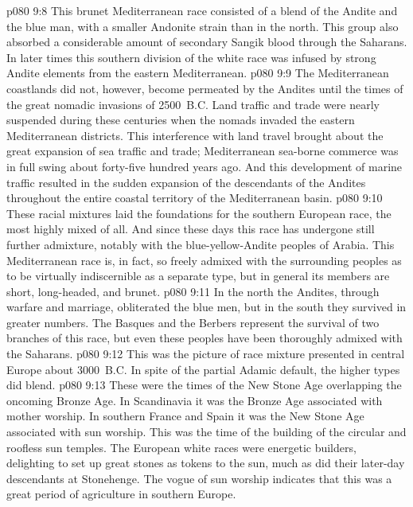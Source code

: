\pc \vs p080 9:8 \bibnobreakspace {} This brunet Mediterranean race consisted of a blend of the Andite and the blue man, with a smaller Andonite strain than in the north. This group also absorbed a considerable amount of secondary Sangik blood through the Saharans. In later times this southern division of the white race was infused by strong Andite elements from the eastern Mediterranean.
\vs p080 9:9 The Mediterranean coastlands did not, however, become permeated by the Andites until the times of the great nomadic invasions of 2500~B.C. Land traffic and trade were nearly suspended during these centuries when the nomads invaded the eastern Mediterranean districts. This interference with land travel brought about the great expansion of sea traffic and trade; Mediterranean sea\hyp{}borne commerce was in full swing about forty\hyp{}five hundred years ago. And this development of marine traffic resulted in the sudden expansion of the descendants of the Andites throughout the entire coastal territory of the Mediterranean basin.
\vs p080 9:10 These racial mixtures laid the foundations for the southern European race, the most highly mixed of all. And since these days this race has undergone still further admixture, notably with the blue\hyp{}yellow\hyp{}Andite peoples of Arabia. This Mediterranean race is, in fact, so freely admixed with the surrounding peoples as to be virtually indiscernible as a separate type, but in general its members are short, long\hyp{}headed, and brunet.
\vs p080 9:11 In the north the Andites, through warfare and marriage, obliterated the blue men, but in the south they survived in greater numbers. The Basques and the Berbers represent the survival of two branches of this race, but even these peoples have been thoroughly admixed with the Saharans.
\pc \vs p080 9:12 This was the picture of race mixture presented in central Europe about 3000~B.C. In spite of the partial Adamic default, the higher types did blend.
\pc \vs p080 9:13 These were the times of the New Stone Age overlapping the oncoming Bronze Age. In Scandinavia it was the Bronze Age associated with mother worship. In southern France and Spain it was the New Stone Age associated with sun worship. This was the time of the building of the circular and roofless sun temples. The European white races were energetic builders, delighting to set up great stones as tokens to the sun, much as did their later\hyp{}day descendants at Stonehenge. The vogue of sun worship indicates that this was a great period of agriculture in southern Europe.
